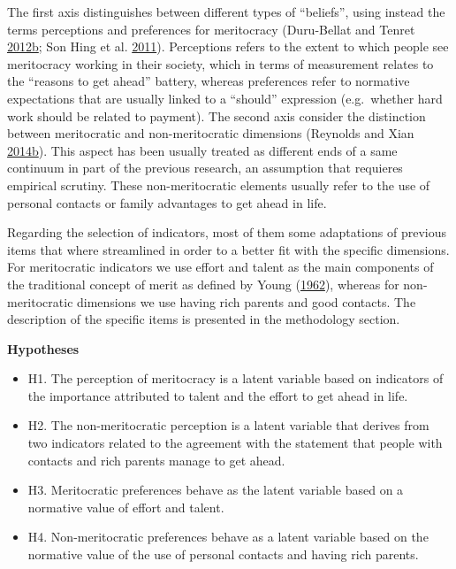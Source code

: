 \documentclass[
]{article}
\begin{document}
The first axis distinguishes between different types of ``beliefs'',
using instead the terms perceptions and preferences for meritocracy
(Duru-Bellat and Tenret
\protect\hyperlink{ref-duru-bellat_whos_2012}{2012}\protect\hyperlink{ref-duru-bellat_whos_2012}{b};
Son Hing et al. \protect\hyperlink{ref-son_hing_merit_2011-1}{2011}).
Perceptions refers to the extent to which people see meritocracy working
in their society, which in terms of measurement relates to the ``reasons
to get ahead'' battery, whereas preferences refer to normative
expectations that are usually linked to a ``should'' expression
(e.g.~whether hard work should be related to payment). The second axis
consider the distinction between meritocratic and non-meritocratic
dimensions (Reynolds and Xian
\protect\hyperlink{ref-reynolds_perceptions_2014}{2014}\protect\hyperlink{ref-reynolds_perceptions_2014}{b}).
This aspect has been usually treated as different ends of a same
continuum in part of the previous research, an assumption that requieres
empirical scrutiny. These non-meritocratic elements usually refer to the
use of personal contacts or family advantages to get ahead in life.

Regarding the selection of indicators, most of them some adaptations of
previous items that where streamlined in order to a better fit with the
specific dimensions. For meritocratic indicators we use effort and
talent as the main components of the traditional concept of merit as
defined by Young (\protect\hyperlink{ref-young_rise_1962}{1962}),
whereas for non-meritocratic dimensions we use having rich parents and
good contacts. The description of the specific items is presented in the
methodology section.

\textbf{Hypotheses}

\begin{itemize}
\item
  H1. The perception of meritocracy is a latent variable based on
  indicators of the importance attributed to talent and the effort to
  get ahead in life.
\item
  H2. The non-meritocratic perception is a latent variable that derives
  from two indicators related to the agreement with the statement that
  people with contacts and rich parents manage to get ahead.
\item
  H3. Meritocratic preferences behave as the latent variable based on a
  normative value of effort and talent.
\item
  H4. Non-meritocratic preferences behave as a latent variable based on
  the normative value of the use of personal contacts and having rich
  parents.
\end{itemize}
\end{document}
